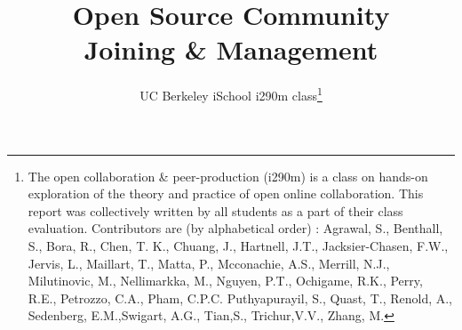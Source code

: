 \documentclass[runningheads,a4paper]{llncs}
\begin{document}
\mainmatter  %

\title{Open Source Community \\ Joining \& Management}



%
%
\author{UC Berkeley iSchool i290m class\footnote{The open collaboration \& peer-production (i290m) is a class on hands-on exploration of the theory and practice of open online collaboration. This report was collectively written by all students as a part of their class evaluation. Contributors are (by alphabetical order) : Agrawal, S., Benthall, S., Bora, R., Chen, T. K., Chuang, J., Hartnell, J.T., Jacksier-Chasen, F.W., Jervis, L., Maillart, T., Matta, P.,  Mcconachie, A.S., Merrill, N.J., Milutinovic, M., Nellimarkka, M., 
Nguyen, P.T., Ochigame, R.K., Perry, R.E., Petrozzo, C.A., Pham, C.P.C.
Puthyapurayil, S., Quast, T., Renold, A.,  Sedenberg, E.M.,Swigart, A.G., Tian,S., Trichur,V.V., Zhang, M.}}


%
%
%

\maketitle
\end{document}
